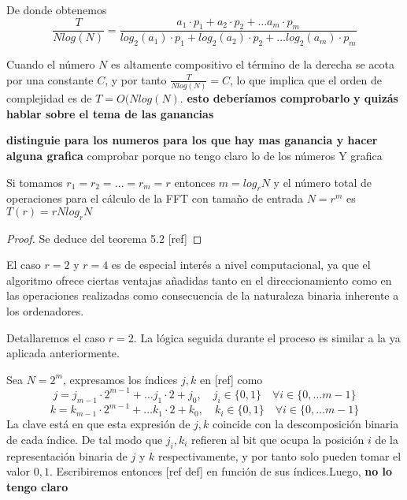 De donde obtenemos
\begin{equation}
    \frac{T}{Nlog(N)} =  \frac{a_1\cdot p_1+a_2\cdot p_2+ \ldots a_m\cdot p_m}{log_2(a_1)\cdot p_1+log_2(a_2)\cdot p_2+ \ldots log_2(a_m)\cdot p_m}
\end{equation}

\noindent Cuando el número $N$ es altamente compositivo el término de la derecha se acota por una constante  $C$, y por tanto $\frac{T}{Nlog(N)} = C $, lo que implica que el orden de complejidad es de $T= O(Nlog(N)$. \textbf{esto deberíamos comprobarlo} \textbf{y quizás hablar sobre el tema de las ganancias}








\textbf{distinguie para los numeros para los que hay mas ganancia y hacer alguna grafica} comprobar porque no tengo claro lo de los números \textbf{}
Y grafica


\begin{proposicion}
 Si tomamos $r_1 = r_2 = \ldots = r_m = r$ entonces  $m = log_rN$ y  el número total de operaciones para el cálculo de la FFT con tamaño de entrada $N =r^m$  es $T(r) = rNlog_rN $
\end{proposicion}
\begin{proof}
Se deduce del teorema 5.2 [ref]

\end{proof}

\noindent El caso $r=2$ y $r=4$ es de especial interés a nivel computacional, ya que el algoritmo ofrece ciertas ventajas añadidas tanto en el direccionamiento como en las operaciones realizadas como consecuencia de la naturaleza binaria inherente a los ordenadores.

Detallaremos el caso $r = 2$. La lógica seguida durante el proceso es similar a la ya aplicada anteriormente.

Sea $N = 2^m$, expresamos los índices $j,k$ en [ref] como 
\begin{equation}
    j = j_{m-1}\cdot 2^{m-1}+ \ldots j_{1}\cdot 2 + j_0, \quad j_i \in \{0,1\} \quad \forall i \in \{0, \ldots m-1\}
\end{equation}
\begin{equation}
    k = k_{m-1}\cdot 2^{m-1}+ \ldots k_{1}\cdot 2 + k_0, \quad k_i \in \{0,1\} \quad \forall i \in \{0, \ldots m-1\}
\end{equation}
La clave está en que esta expresión de $j,k$ coincide con  la descomposición binaria de cada índice. De tal modo que $j_i, k_i$ refieren al bit que ocupa la posición $i$ de la representación binaria de $j$ y $k$ respectivamente, y por tanto solo pueden tomar el valor $0,1$.
Escribiremos entonces [ref def] en función de sus índices.Luego, \textbf{no lo tengo claro}

